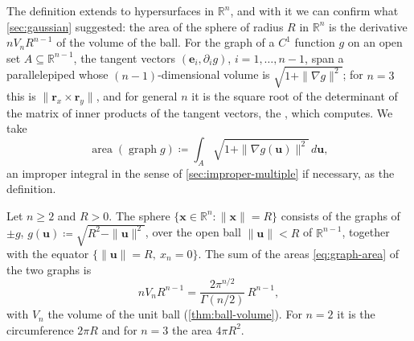 The definition extends to hypersurfaces in $\mathbb R^n$, and with it we can confirm what \cref{sec:gaussian} suggested: the area of the sphere of radius $R$ in $\mathbb R^n$ is the derivative $nV_nR^{n-1}$ of the volume of the ball. For the graph of a $C^1$ function $g$ on an open set $A\subseteq\mathbb R^{n-1}$, the tangent vectors $(\mathbf e_i,\partial_ig)$, $i=1,\ldots,n-1$, span a parallelepiped whose $(n-1)$-dimensional volume is $\sqrt{1+\|\nabla g\|^2}$; for $n=3$ this is $\|\mathbf r_x\times\mathbf r_y\|$, and for general $n$ it is the square root of the determinant of the matrix of inner products of the tangent vectors, the , which  computes. We take
\begin{equation}
\operatorname{area}(\operatorname{graph}g)\coloneqq\int_A\sqrt{1+\|\nabla g(\mathbf u)\|^2}\,d\mathbf u ,
\label{eq:graph-area}
\end{equation}
an improper integral in the sense of \cref{sec:improper-multiple} if necessary, as the definition.

\begin{proposition}
\label{prop:sphere-area}
Let $n\ge2$ and $R>0$. The sphere $\{\mathbf x\in\mathbb R^n: \|\mathbf x\|=R\}$ consists of the graphs of $\pm g$, $g(\mathbf u)\coloneqq\sqrt{R^2-\|\mathbf u\|^2}$, over the open ball $\|\mathbf u\|<R$ of $\mathbb R^{n-1}$, together with the equator $\{\|\mathbf u\|=R,\ x_n=0\}$. The sum of the areas \eqref{eq:graph-area} of the two graphs is
\[
nV_nR^{n-1}=\frac{2\pi^{n/2}}{\Gamma(n/2)}\,R^{n-1},
\]
with $V_n$ the volume of the unit ball (\cref{thm:ball-volume}). For $n=2$ it is the circumference $2\pi R$ and for $n=3$ the area $4\pi R^2$.
\end{proposition}

